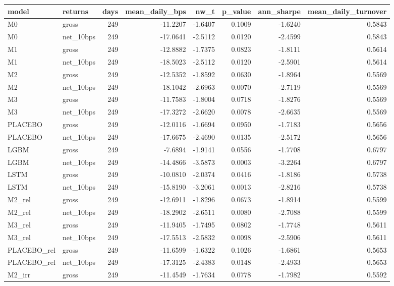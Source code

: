 \begin{tabular}{llrrrrrr}
\toprule
model & returns & days & mean\_daily\_bps & nw\_t & p\_value & ann\_sharpe & mean\_daily\_turnover \\
\midrule
M0 & gross & 249 & -11.2207 & -1.6407 & 0.1009 & -1.6240 & 0.5843 \\
M0 & net\_10bps & 249 & -17.0641 & -2.5112 & 0.0120 & -2.4599 & 0.5843 \\
M1 & gross & 249 & -12.8882 & -1.7375 & 0.0823 & -1.8111 & 0.5614 \\
M1 & net\_10bps & 249 & -18.5023 & -2.5112 & 0.0120 & -2.5901 & 0.5614 \\
M2 & gross & 249 & -12.5352 & -1.8592 & 0.0630 & -1.8964 & 0.5569 \\
M2 & net\_10bps & 249 & -18.1042 & -2.6963 & 0.0070 & -2.7119 & 0.5569 \\
M3 & gross & 249 & -11.7583 & -1.8004 & 0.0718 & -1.8276 & 0.5569 \\
M3 & net\_10bps & 249 & -17.3272 & -2.6620 & 0.0078 & -2.6635 & 0.5569 \\
PLACEBO & gross & 249 & -12.0116 & -1.6694 & 0.0950 & -1.7183 & 0.5656 \\
PLACEBO & net\_10bps & 249 & -17.6675 & -2.4690 & 0.0135 & -2.5172 & 0.5656 \\
LGBM & gross & 249 & -7.6894 & -1.9141 & 0.0556 & -1.7708 & 0.6797 \\
LGBM & net\_10bps & 249 & -14.4866 & -3.5873 & 0.0003 & -3.2264 & 0.6797 \\
LSTM & gross & 249 & -10.0810 & -2.0374 & 0.0416 & -1.8186 & 0.5738 \\
LSTM & net\_10bps & 249 & -15.8190 & -3.2061 & 0.0013 & -2.8216 & 0.5738 \\
M2\_rel & gross & 249 & -12.6911 & -1.8296 & 0.0673 & -1.8914 & 0.5599 \\
M2\_rel & net\_10bps & 249 & -18.2902 & -2.6511 & 0.0080 & -2.7088 & 0.5599 \\
M3\_rel & gross & 249 & -11.9405 & -1.7495 & 0.0802 & -1.7748 & 0.5611 \\
M3\_rel & net\_10bps & 249 & -17.5513 & -2.5832 & 0.0098 & -2.5906 & 0.5611 \\
PLACEBO\_rel & gross & 249 & -11.6599 & -1.6322 & 0.1026 & -1.6861 & 0.5653 \\
PLACEBO\_rel & net\_10bps & 249 & -17.3125 & -2.4383 & 0.0148 & -2.4933 & 0.5653 \\
M2\_irr & gross & 249 & -11.4549 & -1.7634 & 0.0778 & -1.7982 & 0.5592 \\

\end{tabular}

